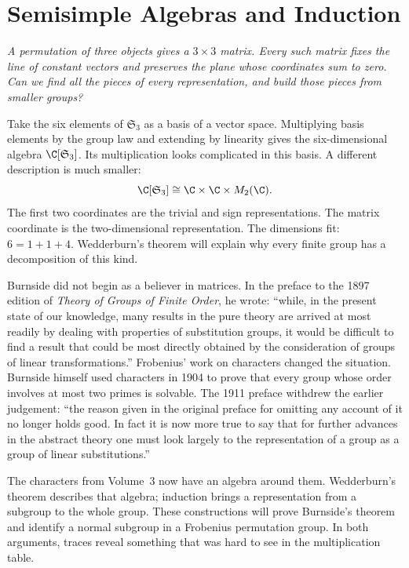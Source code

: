 \chapter{Semisimple Algebras and Induction}

\begin{center}\itshape
A permutation of three objects gives a $3\times3$ matrix. Every such matrix fixes the line of constant vectors and preserves the plane whose coordinates sum to zero. Can we find all the pieces of every representation, and build those pieces from smaller groups?
\end{center}

Take the six elements of $\mathfrak S_3$ as a basis of a vector space. Multiplying basis elements by the group law and extending by linearity gives the six-dimensional algebra $\C[\mathfrak S_3]$. Its multiplication looks complicated in this basis. A different description is much smaller:
\[
\C[\mathfrak S_3]\cong\C\times\C\times M_2(\C).
\]
The first two coordinates are the trivial and sign representations. The matrix coordinate is the two-dimensional representation. The dimensions fit: $6=1+1+4$. Wedderburn's theorem will explain why every finite group has a decomposition of this kind.

Burnside did not begin as a believer in matrices. In the preface to the 1897 edition of \emph{Theory of Groups of Finite Order}, he wrote: ``while, in the present state of our knowledge, many results in the pure theory are arrived at most readily by dealing with properties of substitution groups, it would be difficult to find a result that could be most directly obtained by the consideration of groups of linear transformations.''
Frobenius' work on characters changed the situation. Burnside himself used characters in 1904 to prove that every group whose order involves at most two primes is solvable. The 1911 preface withdrew the earlier judgement: ``the reason given in the original preface for omitting any account of it no longer holds good. In fact it is now more true to say that for further advances in the abstract theory one must look largely to the representation of a group as a group of linear substitutions.''

The characters from Volume~3 now have an algebra around them. Wedderburn's theorem describes that algebra; induction brings a representation from a subgroup to the whole group. These constructions will prove Burnside's theorem and identify a normal subgroup in a Frobenius permutation group. In both arguments, traces reveal something that was hard to see in the multiplication table.

